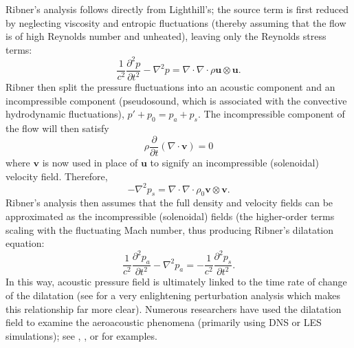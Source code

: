 Ribner's analysis follows directly from Lighthill's; the source term is first reduced by neglecting viscosity and entropic fluctuations (thereby assuming that the flow is of high Reynolds number and unheated), leaving only the Reynolds stress terms:
\begin{equation}
	\frac{1}{c^2}\frac{\partial^2 p}{\partial t^2} - \nabla^2 p = \nabla \cdot \nabla \cdot \rho \mathbf{u} \otimes \mathbf{u}.
\end{equation}
Ribner then split the pressure fluctuations into an acoustic component and an incompressible component (pseudosound, which is associated with the convective hydrodynamic fluctuations), $p' + p_0 = p_a + p_s$. 
The incompressible component of the flow will then satisfy
\begin{equation}
	 \rho \frac{\partial}{\partial t} (\nabla \cdot \mathbf{v} )  = 0
\end{equation}
where $\mathbf{v}$ is now used in place of $\mathbf{u}$ to signify an incompressible (solenoidal) velocity field. 
Therefore, 
\begin{equation}
	- \nabla^2 p_s = \nabla \cdot \nabla \cdot \rho_0 \mathbf{v} \otimes \mathbf{v}.
	\label{eq:solenoidal_pressure}
\end{equation}
Ribner's analysis then assumes that the full density and velocity fields can be approximated as the incompressible (solenoidal) fields (the higher-order terms scaling with the fluctuating Mach number, thus producing Ribner's dilatation equation:
\begin{equation}
	\frac{1}{c^2}\frac{\partial^2 p_a}{\partial t^2} - \nabla^2 p_a = -\frac{1}{c^2}\frac{\partial^2 p_s}{\partial t^2}.
	\label{eq:ribner_source}
\end{equation} 
In this way, acoustic pressure field is ultimately linked to the time rate of change of the dilatation (see \citet{Ristorcelli1997} for a very enlightening perturbation analysis which makes this relationship far more clear).
Numerous researchers have used the dilatation field to examine the aeroacoustic phenomena (primarily using DNS or LES simulations); see \citet{Mitchell1995}, \citet{Colonius1997}, or \citet{Freund2000} for examples.

